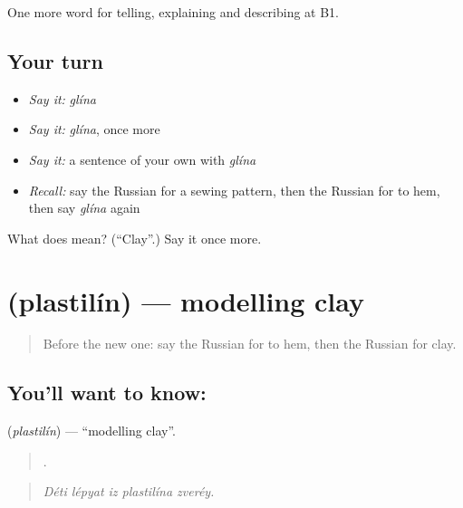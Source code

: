 \begin{grammarlens}[title={What you've built}]
One more word for telling, explaining and describing at B1.
\end{grammarlens}

\subsection*{Your turn}
\begin{itemize}
\raggedright
  \item \emph{Say it:} \emph{glína}
  \item \emph{Say it:} \emph{glína}, once more
  \item \emph{Say it:} a sentence of your own with \emph{glína}
  \item \emph{Recall:} say the Russian for a sewing pattern, then the Russian for to hem, then say \emph{glína} again
\end{itemize}

\begin{tcolorbox}[breakable,colback=teal!4,colframe=teal!35!black,title={Before you move on}]
What does  mean? (\textquotedblleft{}Clay\textquotedblright{}.) Say it once more.
\end{tcolorbox}
\section[\texorpdfstring{\ru{пластилин} (plastilín)}{пластилин (plastilín)}]{ (plastilín) — modelling clay}

\label{lesson:RU-C502-plastilin}



\begin{quote}
Before the new one: say the Russian for to hem, then the Russian for clay.
\end{quote}

\subsection*{You'll want to know: }
\textbf{} (\emph{plastilín}) — \textquotedblleft{}modelling clay\textquotedblright{}.

\begin{quote}
    .
\end{quote}

\begin{quote}
\emph{Déti lépyat iz plastilína zveréy.}
\end{quote}

